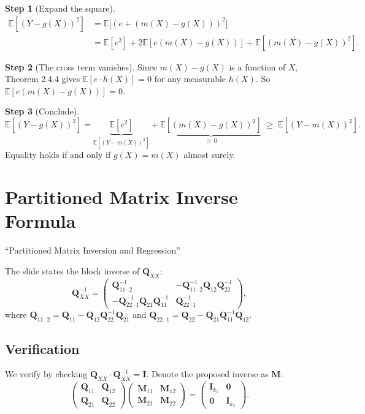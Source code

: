 \documentclass[12pt]{article}
\newcommand{\E}{\mathbb{E}}
\newcommand{\bfQ}{\mathbf{Q}}
\theoremstyle{definition}
\newtheorem{step}{Step}
\begin{document}
\begin{step}[Expand the square]
\begin{align*}
\E[(Y - g(X))^2] &= \E\!\big[(e + (m(X) - g(X)))^2\big]\\
&= \E[e^2] + 2\E[e(m(X) - g(X))] + \E[(m(X) - g(X))^2].
\end{align*}
\end{step}

\begin{step}[The cross term vanishes]
Since $m(X) - g(X)$ is a function of $X$, Theorem 2.4.4 gives $\E[e \cdot h(X)] = 0$ for any measurable $h(X)$. So $\E[e(m(X) - g(X))] = 0$.
\end{step}

\begin{step}[Conclude]
\[
\E[(Y - g(X))^2] = \underbrace{\E[e^2]}_{\E[(Y-m(X))^2]} + \underbrace{\E[(m(X) - g(X))^2]}_{\geq\, 0} \;\geq\; \E[(Y - m(X))^2].
\]
Equality holds if and only if $g(X) = m(X)$ almost surely.
\end{step}


\section{Partitioned Matrix Inverse Formula}
\label{sec:blockinverse}

\begin{tcolorbox}[colback=blue!5, colframe=blue!50, title=Slide Reference]
``Partitioned Matrix Inversion and Regression''
\end{tcolorbox}

The slide states the block inverse of $\bfQ_{XX}$:
\[
\bfQ_{XX}^{-1} =
\begin{pmatrix}
\bfQ_{11\cdot 2}^{-1} & -\bfQ_{11\cdot 2}^{-1}\bfQ_{12}\bfQ_{22}^{-1} \\
-\bfQ_{22\cdot 1}^{-1}\bfQ_{21}\bfQ_{11}^{-1} & \bfQ_{22\cdot 1}^{-1}
\end{pmatrix},
\]
where $\bfQ_{11\cdot 2} = \bfQ_{11} - \bfQ_{12}\bfQ_{22}^{-1}\bfQ_{21}$ and $\bfQ_{22\cdot 1} = \bfQ_{22} - \bfQ_{21}\bfQ_{11}^{-1}\bfQ_{12}$.

\subsection{Verification}

We verify by checking $\bfQ_{XX} \cdot \bfQ_{XX}^{-1} = \mathbf{I}$. Denote the proposed inverse as $\mathbf{M}$:
\[
\begin{pmatrix} \bfQ_{11} & \bfQ_{12} \\ \bfQ_{21} & \bfQ_{22} \end{pmatrix}
\begin{pmatrix} \mathbf{M}_{11} & \mathbf{M}_{12} \\ \mathbf{M}_{21} & \mathbf{M}_{22} \end{pmatrix}
= \begin{pmatrix} \mathbf{I}_{k_1} & \mathbf{0} \\ \mathbf{0} & \mathbf{I}_{k_2} \end{pmatrix}.
\]
\end{document}
